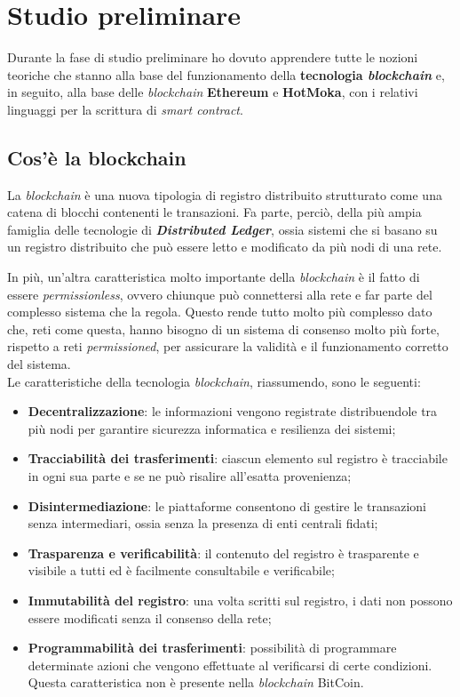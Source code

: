 
\section{Studio preliminare}
Durante la fase di studio preliminare ho dovuto apprendere tutte le nozioni teoriche che stanno alla base del funzionamento della \textbf{tecnologia \textit{blockchain}} e, in seguito, alla base delle \textit{blockchain} \textbf{Ethereum} e \textbf{HotMoka}, con i relativi linguaggi per la scrittura di \textit{smart contract}.

\subsection{Cos'è la blockchain}
La \textit{blockchain} è una nuova tipologia di registro distribuito strutturato come una catena di blocchi contenenti le transazioni. Fa parte, perciò, della più ampia famiglia delle tecnologie di \textbf{\textit{Distributed Ledger}}, ossia sistemi che si basano su un registro distribuito che può essere letto e modificato da più nodi di una rete.

In più, un'altra caratteristica molto importante della \textit{blockchain} è il fatto di essere \textit{permissionless}, ovvero chiunque può connettersi alla rete e far parte del complesso sistema che la regola. Questo rende tutto molto più complesso dato che, reti come questa, hanno bisogno di un sistema di consenso molto più forte, rispetto a reti \textit{permissioned}, per assicurare la validità e il funzionamento corretto del sistema. \\

\noindent Le caratteristiche della tecnologia \textit{blockchain}, riassumendo, sono le seguenti:
\begin{itemize}
  \item \textbf{Decentralizzazione}: le informazioni vengono registrate distribuendole tra più nodi per garantire sicurezza informatica e resilienza dei sistemi;
  \item \textbf{Tracciabilità dei trasferimenti}: ciascun elemento sul registro è tracciabile in ogni sua parte e se ne può risalire all’esatta provenienza;
  \item \textbf{Disintermediazione}: le piattaforme consentono di gestire le transazioni senza intermediari, ossia senza la presenza di enti centrali fidati;
  \item \textbf{Trasparenza e verificabilità}: il contenuto del registro è trasparente e visibile a tutti ed è facilmente consultabile e verificabile;
  \item \textbf{Immutabilità del registro}: una volta scritti sul registro, i dati non possono essere modificati senza il consenso della rete;
  \item \textbf{Programmabilità dei trasferimenti}: possibilità di programmare determinate azioni che vengono effettuate al verificarsi di certe condizioni. Questa caratteristica non è presente nella \textit{blockchain} BitCoin.
\end{itemize}

